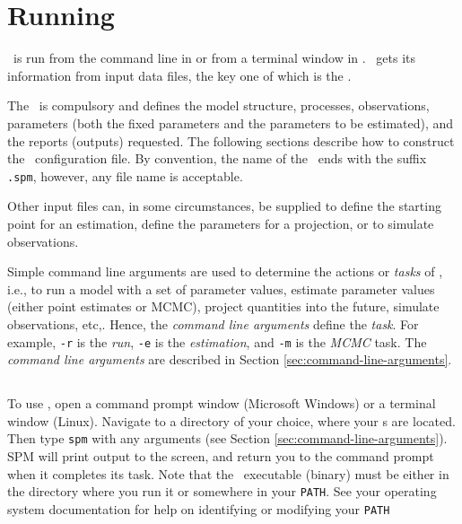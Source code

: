 \section{Running \SPM\label{sec:running-spm}}

\SPM\ is run from the command line in  or from a terminal window in . \SPM\ gets its information from input data files, the key one of which is the \config{}. 

The \config\ is compulsory and defines the model structure, processes, observations, parameters (both the fixed parameters and the parameters to be estimated), and the reports (outputs) requested. The following sections  describe how to construct the \SPM\ configuration file. By convention, the name of the \config\ ends with the suffix \texttt{.spm}, however, any file name is acceptable.

Other input files can, in some circumstances, be supplied to define the starting point for an estimation, define the parameters for a projection, or to simulate observations.

Simple command line arguments are used to determine the actions or \emph{tasks} of \SPM, i.e., to run a model with a set of parameter values, estimate parameter values (either point estimates or MCMC), project quantities into the future, simulate observations, etc,. Hence, the \emph{command line arguments} define the \emph{task}. For example, \texttt{-r} is the \emph{run}, \texttt{-e} is the \emph{estimation}, and \texttt{-m} is the \emph{MCMC} task. The \emph{command line arguments} are described in Section \ref{sec:command-line-arguments}.

\subsection{}

To use \SPM, open a command prompt window (Microsoft Windows) or a terminal window (Linux). Navigate to a directory of your choice, where your \config s are located. Then type \texttt{spm} with any arguments (see Section \ref{sec:command-line-arguments}). SPM will print output to the screen, and return you to the command prompt when it completes its task. Note that the \SPM\ executable (binary) must be either in the directory where you run it or somewhere in your \texttt{PATH}. See your operating system documentation for help on identifying or modifying your \texttt{PATH}

